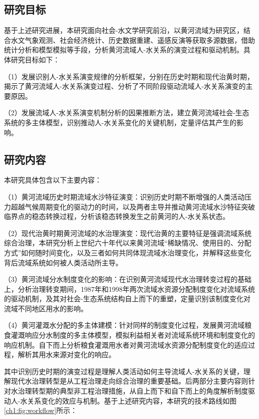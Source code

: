 
\subsection{研究目标}
基于上述研究进展，本研究面向社会-水文学研究前沿，以黄河流域为研究区，结合水文气象观测、社会经济统计、历史数据重建、遥感反演等获取多源数据，借助统计分析和模型模拟等手段，分析黄河流域人-水关系的演变过程和驱动机制。具体研究目标如下：

（1）发展识别人-水关系演变规律的分析框架，分别在历史时期和现代治黄时期，揭示了黄河流域人-水关系演变过程、分析了不同阶段驱动流域人-水关系演变的主要原因。

（2）发展流域人-水关系演变机制分析的因果推断方法，建立黄河流域社会-生态系统的多主体模型，识别推动人-水关系变化的关键机制，定量评估其产生的影响。


\subsection{研究内容}

本研究具体包含以下主要内容：

（1）黄河流域历史时期流域水沙特征演变：识别历史时期不断增强的人类活动压力超越气候周期变化的驱动力的时间，以及两者主导并推动黄河流域水沙特征突破临界点的稳态转换过程，分析该稳态转换发生之前黄河的人-水关系状态。

（2）现代治黄时期黄河流域的水治理演变：现代治黄的主要特征是强调流域系统综合治理，本研究分析上世纪六十年代以来黄河流域“稀缺情况、使用目的、分配方式”如何随时间变化，以及三者如何共同体现流域水治理变化，并解释这些变化背后流域系统如何被人类活动所主导。

（3）黄河流域分水制度变化的影响：在识别黄河流域现代水治理转变过程的基础上，分析治理转变期间，1987年和1998年两次流域水资源分配制度变化对流域系统的驱动机制，及其对社会-生态系统结构自上而下的重塑，定量识别该制度变化对流域不同地区用水的影响。

（4）黄河灌溉水分配的多主体建模：针对同样的制度变化过程，发展黄河流域粮食灌溉响应分水制度的多主体模型，模拟利益相关者对流域系统环境和制度变化的响应机制。自下而上分析粮食灌溉用水者对黄河流域水资源分配制度变化的适应过程，解析其用水来源对变化的响应。

其中识别历史时期的演变过程是理解人类活动如何主导流域人-水关系的关键，理解现代水治理转型是从工程治理走向综合治理的重要基础。后两部分主要内容则针对水治理转型期的典型非工程治理措施，从自上而下和自下而上的角度解析制度驱动人-水关系变化的效应与机制。基于上述研究内容，本研究的技术路线如图\ref{ch1:fig:workflow}所示：

